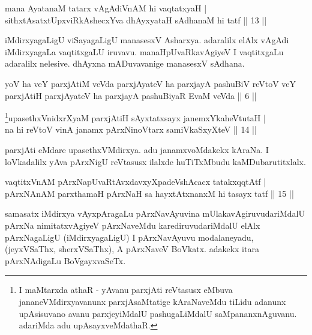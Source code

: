 \begin{shl}
mana AyatanaM tatarx vAgAdiVnAM hi vaqtatxyaH | \\
sithxtAsatxtUpxviRkAshecxYva dhAyxyataH sAdhanaM hi tatf \hfill|| 13 || 
\end{shl}

\begin{artha} 
iMdirxyagaLigU viSayagaLigU manasesxV Asharxya. adaralilx elAlx vAgAdi 
iMdirxyagaLa vaqtitxgaLU iruvavu. manaHpUvaRkavAgiyeV I vaqtitxgaLu 
adaralilx nelesive. dhAyxna mADuvavanige manasesxV sAdhana.
\end{artha}

\begin{kandikeshl}
yoV ha veY parxjAtiM veVda parxjAyateV ha parxjayA pashuBiV reVtoV veY parxjAtiH parxjAyateV ha parxjayA pashuBiyaR EvaM veVda || 6 ||
\end{kandikeshl}


\begin{shl}
\footnote{I maMtarxda athaR - yAvanu parxjAti reVtasusx eMbuva 
jananeVMdirxyavanunx parxjAsaMtatige kAraNaveMdu tiLidu adanunx 
upAsisuvano avanu parxjeyiMdalU pashugaLiMdalU saMpananxnAguvanu. 
adariMda adu upAsayxveMdathaR.}upasethxVnidxrXyaM parxjAtiH sAyxtatxsayx janemxYkaheVtutaH | \\
na hi reVtoV vinA janamx pArxNinoV\s tarx samiVkaSxyXteV \hfill|| 14 || 
\end{shl}

\begin{artha} 
parxjAti eMdare upasethxVMdirxya. adu janamxvoMdakekx kAraNa. I loVkadalilx yAva pArxNigU reVtasusx ilalxde huTiTxMbudu kaMDubarutitxlalx.
\end{artha}


\begin{shl}
vaqtitxVnAM pArxNapUvaRtAvxdavxyXpadeVshAcacx tatakxqqtAtf | \\
pArxNAnAM parxthamaH pArxNaH sa hayxtAtx\s nanxM hi tasayx tatf \hfill|| 15 || 
\end{shl}

\begin{artha}
samasatx iMdirxya vAyxpAragaLu pArxNavAyuvina mUlakavAgiruvudariMdalU pArxNa nimitatxvAgiyeV pArxNaveMdu karediruvudariMdalU elAlx pArxNagaLigU (iMdirxyagaLigU) I pArxNavAyuvu modalaneyadu, (jeyxVSaThx, sherxVSaThx), A pArxNaveV BoVkatx. adakekx itara pArxNAdigaLu BoVgayxvaSeTx.
\end{artha}

